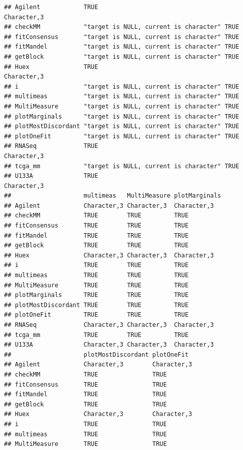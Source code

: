 \documentclass{article}\usepackage[]{graphicx}\usepackage[]{color}
\makeatletter
\newenvironment{kframe}{%
 \def\at@end@of@kframe{}%
 \ifinner\ifhmode%
  \def\at@end@of@kframe{\end{minipage}}%
  \begin{minipage}{\columnwidth}%
 \fi\fi%
 \def\FrameCommand##1{\hskip\@totalleftmargin \hskip-\fboxsep
 \colorbox{shadecolor}{##1}\hskip-\fboxsep
     \hskip-\linewidth \hskip-\@totalleftmargin \hskip\columnwidth}%
 \MakeFramed {\advance\hsize-\width
   \@totalleftmargin\z@ \linewidth\hsize
   \@setminipage}}%
 {\par\unskip\endMakeFramed%
 \at@end@of@kframe}
\newenvironment{knitrout}{}{} %
\makeatother
\begin{document}
\begin{knitrout}
\begin{kframe}
\begin{verbatim}
## Agilent            TRUE                                   Character,3
## checkMM            "target is NULL, current is character" TRUE       
## fitConsensus       "target is NULL, current is character" TRUE       
## fitMandel          "target is NULL, current is character" TRUE       
## getBlock           "target is NULL, current is character" TRUE       
## Huex               TRUE                                   Character,3
## i                  "target is NULL, current is character" TRUE       
## multimeas          "target is NULL, current is character" TRUE       
## MultiMeasure       "target is NULL, current is character" TRUE       
## plotMarginals      "target is NULL, current is character" TRUE       
## plotMostDiscordant "target is NULL, current is character" TRUE       
## plotOneFit         "target is NULL, current is character" TRUE       
## RNASeq             TRUE                                   Character,3
## tcga_mm            "target is NULL, current is character" TRUE       
## U133A              TRUE                                   Character,3
##                    multimeas   MultiMeasure plotMarginals
## Agilent            Character,3 Character,3  Character,3  
## checkMM            TRUE        TRUE         TRUE         
## fitConsensus       TRUE        TRUE         TRUE         
## fitMandel          TRUE        TRUE         TRUE         
## getBlock           TRUE        TRUE         TRUE         
## Huex               Character,3 Character,3  Character,3  
## i                  TRUE        TRUE         TRUE         
## multimeas          TRUE        TRUE         TRUE         
## MultiMeasure       TRUE        TRUE         TRUE         
## plotMarginals      TRUE        TRUE         TRUE         
## plotMostDiscordant TRUE        TRUE         TRUE         
## plotOneFit         TRUE        TRUE         TRUE         
## RNASeq             Character,3 Character,3  Character,3  
## tcga_mm            TRUE        TRUE         TRUE         
## U133A              Character,3 Character,3  Character,3  
##                    plotMostDiscordant plotOneFit 
## Agilent            Character,3        Character,3
## checkMM            TRUE               TRUE       
## fitConsensus       TRUE               TRUE       
## fitMandel          TRUE               TRUE       
## getBlock           TRUE               TRUE       
## Huex               Character,3        Character,3
## i                  TRUE               TRUE       
## multimeas          TRUE               TRUE       
## MultiMeasure       TRUE               TRUE       

\end{verbatim}
\end{kframe}
\end{knitrout}
\end{document}
